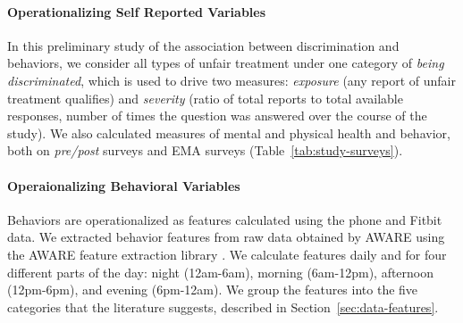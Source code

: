 \paragraph{Operationalizing Self Reported Variables }
In this preliminary study of the association between discrimination and behaviors, we consider all types of unfair treatment under one category of \textit{being discriminated}, which is used to drive two measures: \textit{exposure} (any report of unfair treatment qualifies) and \textit{severity} (ratio of total reports to total available responses, \ie number of times the question was answered over the course of the study). 
We also calculated measures of mental and physical health and behavior, both on \textit{pre/post} surveys and EMA surveys 
(Table~\ref{tab:study-surveys}). 


\paragraph{Operaionalizing Behavioral Variables} Behaviors are operationalized as features calculated using the phone and Fitbit data.  We extracted behavior features from raw data obtained by AWARE using  the AWARE feature extraction library \citep{Chikersal:2019}. We calculate features daily and for four different parts of the day: night (12am-6am), morning (6am-12pm), afternoon (12pm-6pm), and evening (6pm-12am). We group the features into  the five categories that the literature suggests, described in Section~\ref{sec:data-features}. %



